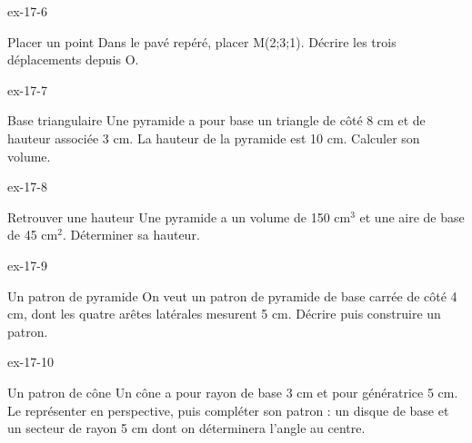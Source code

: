 \begin{blocLivre}{ex-17-6}\begin{exercice}[2]{Placer un point}
Dans le pavé repéré, placer M(2;3;1). Décrire les trois déplacements depuis O.
\label{fig-ex-17-6}
\end{exercice}\end{blocLivre}
\begin{blocLivre}{ex-17-7}\begin{exercice}[2]{Base triangulaire}
Une pyramide a pour base un triangle de côté 8 cm et de hauteur associée 3 cm. La hauteur de la pyramide est 10 cm. Calculer son volume.
\label{fig-ex-17-7}
\end{exercice}\end{blocLivre}
\begin{blocLivre}{ex-17-8}\begin{exercice}[2]{Retrouver une hauteur}
Une pyramide a un volume de 150 cm$^3$ et une aire de base de 45 cm$^2$. Déterminer sa hauteur.
\label{fig-ex-17-8}
\end{exercice}\end{blocLivre}
\begin{blocLivre}{ex-17-9}\begin{exercice}[2]{Un patron de pyramide}
On veut un patron de pyramide de base carrée de côté 4 cm, dont les quatre arêtes latérales mesurent 5 cm. Décrire puis construire un patron.
\label{fig-ex-17-9}
\end{exercice}\end{blocLivre}
\begin{blocLivre}{ex-17-10}\begin{exercice}[2]{Un patron de cône}
Un cône a pour rayon de base 3 cm et pour génératrice 5 cm. Le représenter en perspective, puis compléter son patron : un disque de base et un secteur de rayon 5 cm dont on déterminera l’angle au centre.
\label{fig-ex-17-10}
\end{exercice}\end{blocLivre}


